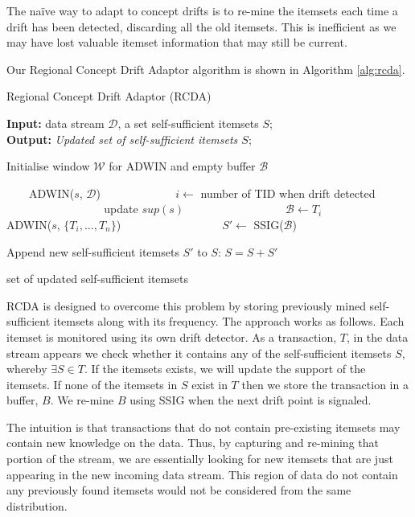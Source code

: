 The na\"ive way to adapt to concept drifts is to re-mine the itemsets each time a drift has been detected, discarding all the old itemsets. This is inefficient as we may have lost valuable itemset information that may still be current. 

Our Regional Concept Drift Adaptor algorithm is shown in Algorithm \ref{alg:rcda}.

\begin{algorithm}[h!]
\caption{Regional Concept Drift Adaptor (RCDA)} 
\label{alg:rcda}
\hspace*{0.02in} {\bf Input:} 
data stream $\mathcal{D}$, a set self-sufficient itemsets $S$;\\
\hspace*{0.02in} {\bf Output:} 
\textit{Updated set of self-sufficient itemsets $S$};
\begin{algorithmic}[1]

\State Initialise window $\mathcal{W}$ for ADWIN and empty buffer $\mathcal{B}$

　　\State ADWIN($s$, $\mathcal{D}$)
　　　　\State $i \leftarrow$ number of TID when drift detected
　　　　    \State update $sup(s)$
　　　　\Else
　　　　    \State $\mathcal{B} \leftarrow T_i$
　　　　\EndIf
　　　　\State ADWIN($s$, $\{T_i, ..., T_n\}$)
　　　　    \State $S' \leftarrow$ SSIG($\mathcal{B}$)
　　　　\EndIf
　　\EndIf
\EndFor

\State Append new self-sufficient itemsets $S'$ to $S$: $S = S + S'$

\State \Return set of updated self-sufficient itemsets
\end{algorithmic}
\end{algorithm}

RCDA is designed to overcome this problem by storing previously mined self-sufficient itemsets along with its frequency. The approach works as follows.
Each itemset is monitored using its own drift detector. As a transaction, $T$, in the data stream appears we check whether it contains any of the self-sufficient itemsets $S$, whereby $\exists S \in T$. If the itemsets exists, we will update the support of the itemsets. If none of the itemsets in $S$ exist in $T$ then we store the transaction in a buffer, $B$. We re-mine $B$ using SSIG when the next drift point is signaled.  

The intuition is that transactions that do not contain pre-existing itemsets may contain new knowledge on the data. Thus, by capturing and re-mining that portion of the stream, we are essentially looking for new itemsets that are just appearing in the new incoming data stream. This region of data do not contain any previously found itemsets would not be considered from the same distribution.

